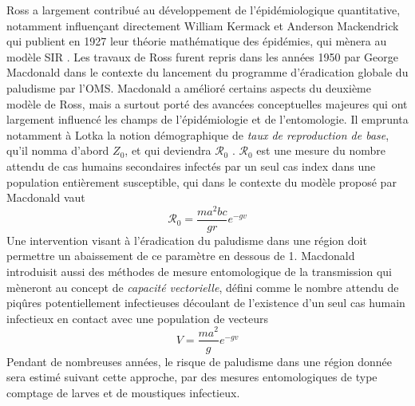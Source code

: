 Ross a largement contribué au développement de l'épidémiologique quantitative, notamment influençant directement William Kermack et Anderson Mackendrick qui publient en 1927 leur théorie mathématique des épidémies, qui mènera au modèle SIR \cite{kermack1927contributions}.
Les travaux de Ross furent repris dans les années 1950 par George Macdonald dans le contexte du lancement du programme d'éradication globale du paludisme par l'OMS.
Macdonald a amélioré certains aspects du deuxième modèle de Ross, mais a surtout porté des avancées  conceptuelles majeures qui ont largement influencé les champs de l'épidémiologie et de l'entomologie.
Il emprunta notamment à Lotka la notion démographique de {\em taux de reproduction de base}, qu'il nomma d'abord $Z_0$, et qui deviendra $\mathcal{R}_0$ \cite{macdonald1952analysis}. 
$\mathcal{R}_0$ est une mesure du nombre attendu de cas humains secondaires infectés par un seul cas index dans une population entièrement susceptible, qui dans le contexte du modèle proposé par Macdonald vaut
\begin{equation}
\mathcal{R}_0 = \frac{ma^2bc}{gr}e^{-gv}
\end{equation}
Une intervention visant à l'éradication du paludisme dans une région doit permettre un abaissement de ce paramètre en dessous de 1.
Macdonald introduisit aussi des méthodes de mesure entomologique de la transmission qui mèneront au concept de {\em capacité vectorielle}, défini comme le nombre attendu de piqûres potentiellement infectieuses découlant de l'existence d'un seul cas humain infectieux en contact avec une population de vecteurs 
\begin{equation}
V = \frac{ma^2}{g}e^{-gv}
\end{equation}
Pendant de nombreuses années, le risque de paludisme dans une région donnée sera estimé suivant cette approche, par des mesures entomologiques de type comptage de larves et de moustiques infectieux.

